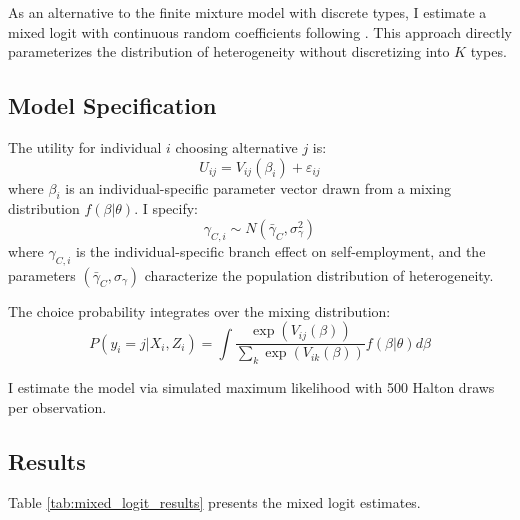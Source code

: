 \documentclass[12pt]{article}
\begin{document}
As an alternative to the finite mixture model with discrete types, I estimate a mixed logit with continuous random coefficients following \citet{train2009}. This approach directly parameterizes the distribution of heterogeneity without discretizing into $K$ types.

\subsection{Model Specification}

The utility for individual $i$ choosing alternative $j$ is:
\begin{equation}
U_{ij} = V_{ij}(\beta_i) + \varepsilon_{ij}
\end{equation}
where $\beta_i$ is an individual-specific parameter vector drawn from a mixing distribution $f(\beta | \theta)$. I specify:
\begin{equation}
\gamma_{C,i} \sim N(\bar{\gamma}_C, \sigma^2_\gamma)
\end{equation}
where $\gamma_{C,i}$ is the individual-specific branch effect on self-employment, and the parameters $(\bar{\gamma}_C, \sigma_\gamma)$ characterize the population distribution of heterogeneity.

The choice probability integrates over the mixing distribution:
\begin{equation}
P(y_i = j | X_i, Z_i) = \int \frac{\exp(V_{ij}(\beta))}{\sum_k \exp(V_{ik}(\beta))} f(\beta | \theta) d\beta
\end{equation}

I estimate the model via simulated maximum likelihood with 500 Halton draws per observation.

\subsection{Results}

Table \ref{tab:mixed_logit_results} presents the mixed logit estimates.
\end{document}
